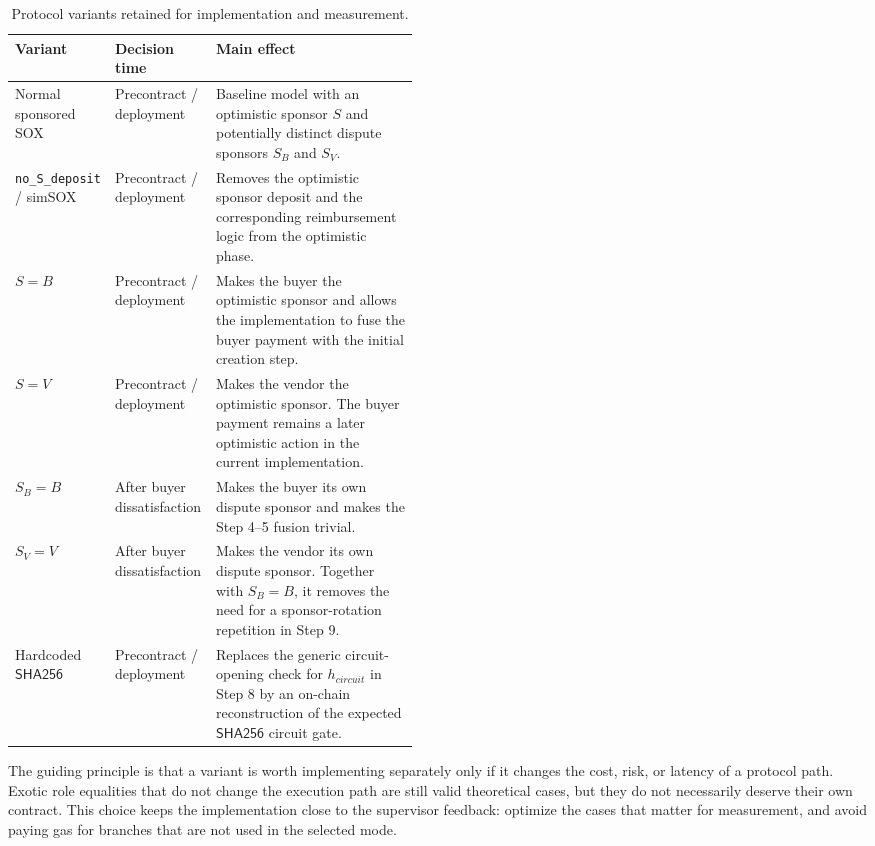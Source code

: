 \begin{table}[htbp]
  \centering
  \begin{tabularx}{\linewidth}{>{\raggedright\arraybackslash}p{0.22\linewidth}>{\raggedright\arraybackslash}p{0.25\linewidth}>{\raggedright\arraybackslash}X}
    \toprule
    Variant & Decision time & Main effect \\
    \midrule
    Normal sponsored SOX &
    Precontract / deployment &
    Baseline model with an optimistic sponsor \(S\) and potentially distinct dispute
    sponsors \(S_B\) and \(S_V\). \\
    \texttt{no\_S\_deposit} / simSOX &
    Precontract / deployment &
    Removes the optimistic sponsor deposit and the corresponding reimbursement logic from
    the optimistic phase. \\
    \(S=B\) &
    Precontract / deployment &
    Makes the buyer the optimistic sponsor and allows the implementation to fuse the buyer
    payment with the initial creation step. \\
    \(S=V\) &
    Precontract / deployment &
    Makes the vendor the optimistic sponsor. The buyer payment remains a later optimistic
    action in the current implementation. \\
    \(S_B=B\) &
    After buyer dissatisfaction &
    Makes the buyer its own dispute sponsor and makes the Step 4--5 fusion trivial. \\
    \(S_V=V\) &
    After buyer dissatisfaction &
    Makes the vendor its own dispute sponsor. Together with \(S_B=B\), it removes the need
    for a sponsor-rotation repetition in Step 9. \\
    Hardcoded \(\mathsf{SHA256}\) &
    Precontract / deployment &
    Replaces the generic circuit-opening check for \(h_{\mathit{circuit}}\) in Step 8 by an
    on-chain reconstruction of the expected \(\mathsf{SHA256}\) circuit gate. \\
    \bottomrule
  \end{tabularx}
  \caption{Protocol variants retained for implementation and measurement.}
  \label{tab:variant-classification}
\end{table}

The guiding principle is that a variant is worth implementing separately only if it changes
the cost, risk, or latency of a protocol path. Exotic role equalities that do not change the
execution path are still valid theoretical cases, but they do not necessarily deserve their
own contract. This choice keeps the implementation close to the supervisor feedback:
optimize the cases that matter for measurement, and avoid paying gas for branches that are
not used in the selected mode.

